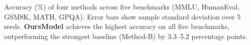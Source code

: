 \caption{Accuracy (\%) of four methods across five benchmarks (MMLU, HumanEval, GSM8K, MATH, GPQA). Error bars show sample standard deviation over 5 seeds. \textbf{OursModel} achieves the highest accuracy on all five benchmarks, outperforming the strongest baseline (Method-B) by 3.3--5.2 percentage points.}
